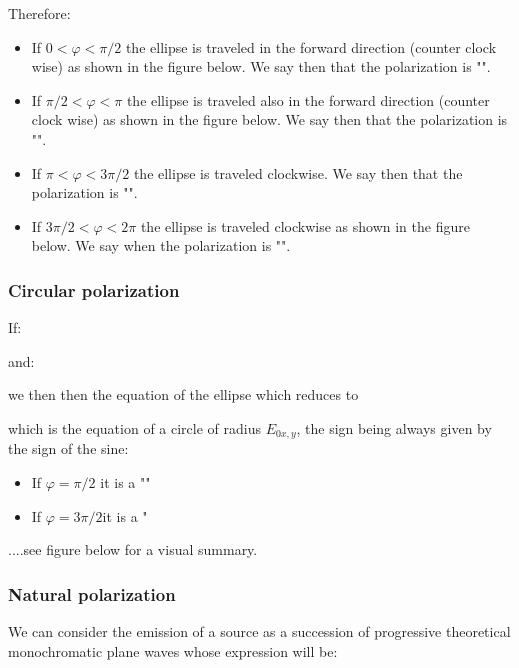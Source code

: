 	Therefore:
	\begin{itemize}
		\item If $0<\varphi <\pi/2$ the ellipse is traveled in the forward direction (counter clock wise) as shown in the figure below. We say then that the polarization is "".

		\item If $\pi/2<\varphi <\pi$ the ellipse is traveled also in the forward direction (counter clock wise) as shown in the figure below. We say then that the polarization is "".

		\item If $\pi<\varphi<3\pi/2$ the ellipse is traveled clockwise. We say then that the polarization is "".

		\item If $3\pi/2<\varphi<2\pi$ the ellipse is traveled clockwise as shown in the figure below. We say when the polarization is "".
	\end{itemize}
	
	\subsubsection{Circular polarization}
	If:
	
	and:
	
	we then then the equation of the ellipse which reduces to
	
	which is the equation of a circle of radius $E_{0x,y}$, the sign being always given by the sign of the sine:
	\begin{itemize}
		\item If $\varphi=\pi/2$ it is a ""

		\item If $\varphi=3\pi/2$it is a "
	\end{itemize}
	....see figure below for a visual summary.
		
	\subsubsection{Natural polarization}
	We can consider the emission of a source as a succession of progressive theoretical monochromatic plane waves whose expression will be:
	
